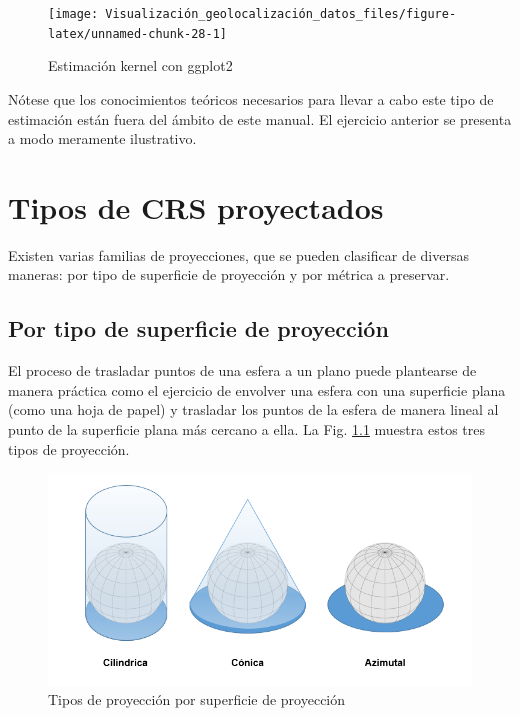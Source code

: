 \documentclass[
]{book}
\theoremstyle{definition}
\theoremstyle{definition}
\theoremstyle{definition}
\theoremstyle{definition}
\theoremstyle{remark}
\begin{document}
\begin{figure}

{\centering \texttt{[image: Visualización\_geolocalización\_datos\_files/figure-latex/unnamed-chunk-28-1]} 

}

\caption{Estimación kernel con ggplot2}\label{fig:unnamed-chunk-28}
\end{figure}

Nótese que los conocimientos teóricos necesarios para llevar a cabo este tipo de
estimación están fuera del ámbito de este manual. El ejercicio anterior se
presenta a modo meramente ilustrativo.

\hypertarget{appendix-anexo}{%
\appendix}


\hypertarget{crsproy}{%
\chapter{Tipos de CRS proyectados}\label{crsproy}}

Existen varias familias de proyecciones, que se pueden clasificar de diversas
maneras: por tipo de superficie de proyección y por métrica a preservar.

\hypertarget{por-tipo-de-superficie-de-proyecciuxf3n}{%
\section{Por tipo de superficie de proyección}\label{por-tipo-de-superficie-de-proyecciuxf3n}}

El proceso de trasladar puntos de una esfera a un plano puede plantearse de
manera práctica como el ejercicio de envolver una esfera con una superficie
plana (como una hoja de papel) y trasladar los puntos de la esfera de manera
lineal al punto de la superficie plana más cercano a ella. La Fig.
\ref{fig:fi-proys} muestra estos tres tipos de proyección.

\begin{figure}

{\centering \includegraphics[width=0.6\linewidth]{img/tipos_proy} 

}

\caption{Tipos de proyección por superficie de proyección}\label{fig:fi-proys}
\end{figure}
\end{document}
